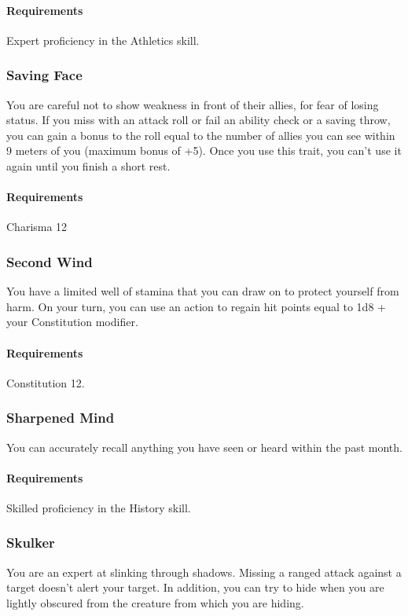     \paragraph{Requirements} Expert proficiency in the Athletics skill.
\subsubsection{Saving Face} \label{feat::savingface}
    You are careful not to show weakness in front of their allies, for fear of losing status.
    If you miss with an attack roll or fail an ability check or a saving throw, you can gain a bonus to the roll equal to the number of allies you can see within 9 meters of you (maximum bonus of +5).
    Once you use this trait, you can't use it again until you finish a short rest.
    \paragraph{Requirements} Charisma 12
\subsubsection{Second Wind} \label{feat::secondwind}
    You have a limited well of stamina that you can draw on to protect yourself from harm.
    On your turn, you can use an action to regain hit points equal to 1d8 + your Constitution modifier.
    \paragraph{Requirements} Constitution 12.
\subsubsection{Sharpened Mind} \label{feat::sharpenedmind}
    You can accurately recall anything you have seen or heard within the past month.
    \paragraph{Requirements} Skilled proficiency in the History skill.
\subsubsection{Skulker} \label{feat::skulker}
    You are an expert at slinking through shadows.
    Missing a ranged attack against a target doesn't alert your target.
    In addition, you can try to hide when you are lightly obscured from the creature from which you are hiding.
